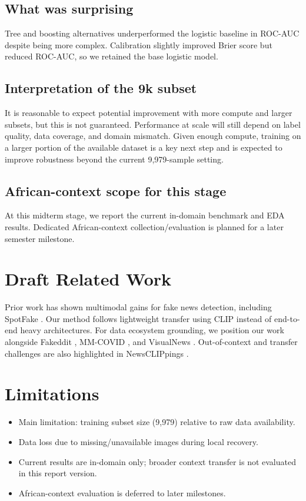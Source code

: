 \documentclass[a4paper,10.5pt,twoside]{article}
\begin{document}
\subsection{What was surprising}
Tree and boosting alternatives underperformed the logistic baseline in ROC-AUC despite being more complex.
Calibration slightly improved Brier score but reduced ROC-AUC, so we retained the base logistic model.

\subsection{Interpretation of the 9k subset}
It is reasonable to expect potential improvement with more compute and larger subsets, but this is not guaranteed.
Performance at scale will still depend on label quality, data coverage, and domain mismatch.
Given enough compute, training on a larger portion of the available dataset is a key next step and is expected to improve robustness beyond the current 9,979-sample setting.
\subsection{African-context scope for this stage}
At this midterm stage, we report the current in-domain benchmark and EDA results.
Dedicated African-context collection/evaluation is planned for a later semester milestone.

\section{Draft Related Work}
Prior work has shown multimodal gains for fake news detection, including SpotFake \cite{khattar2020spotfake}.
Our method follows lightweight transfer using CLIP \cite{radford2021clip} instead of end-to-end heavy architectures.
For data ecosystem grounding, we position our work alongside Fakeddit \cite{nakamura2019fakeddit}, MM-COVID \cite{li2020mmcovid}, and VisualNews \cite{liu2021visualnews}.
Out-of-context and transfer challenges are also highlighted in NewsCLIPpings \cite{luo2021newsclippings}.

\section{Limitations}
\begin{itemize}
    \item Main limitation: training subset size (9,979) relative to raw data availability.
    \item Data loss due to missing/unavailable images during local recovery.
    \item Current results are in-domain only; broader context transfer is not evaluated in this report version.
    \item African-context evaluation is deferred to later milestones.
\end{itemize}
\end{document}

